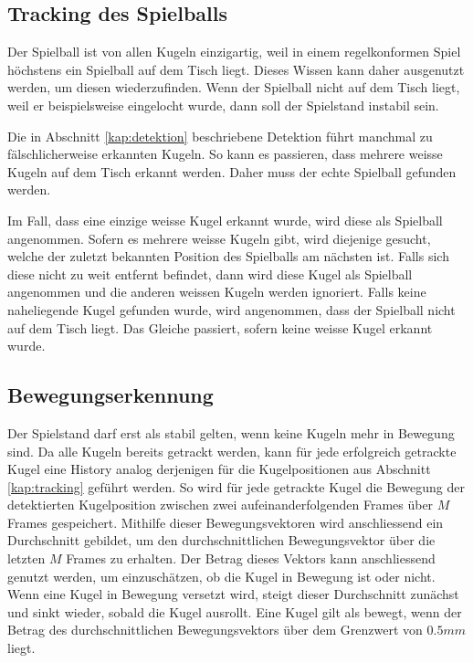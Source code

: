 \subsection{Tracking des Spielballs}
Der Spielball ist von allen Kugeln einzigartig, weil in einem regelkonformen Spiel höchstens ein Spielball auf dem Tisch liegt.
Dieses Wissen kann daher ausgenutzt werden, um diesen wiederzufinden.
Wenn der Spielball nicht auf dem Tisch liegt, weil er beispielsweise eingelocht wurde, dann soll der Spielstand instabil sein.

Die in Abschnitt \ref{kap:detektion} beschriebene Detektion führt manchmal zu fälschlicherweise erkannten Kugeln.
So kann es passieren, dass mehrere weisse Kugeln auf dem Tisch erkannt werden.
Daher muss der echte Spielball gefunden werden.

Im Fall, dass eine einzige weisse Kugel erkannt wurde, wird diese als Spielball angenommen.
Sofern es mehrere weisse Kugeln gibt, wird diejenige gesucht, welche der zuletzt bekannten Position des Spielballs am nächsten ist.
Falls sich diese nicht zu weit entfernt befindet, dann wird diese Kugel als Spielball angenommen und die
anderen weissen Kugeln werden ignoriert.
Falls keine naheliegende Kugel gefunden wurde, wird angenommen, dass der Spielball nicht auf dem Tisch liegt.
Das Gleiche passiert, sofern keine weisse Kugel erkannt wurde.

\subsection{Bewegungserkennung}
Der Spielstand darf erst als stabil gelten, wenn keine Kugeln mehr in Bewegung sind.
Da alle Kugeln bereits getrackt werden, kann für jede erfolgreich getrackte Kugel eine History analog derjenigen für die
Kugelpositionen aus Abschnitt \ref{kap:tracking} geführt werden.
So wird für jede getrackte Kugel die Bewegung der detektierten Kugelposition zwischen zwei aufeinanderfolgenden Frames
über $M$ Frames gespeichert.
Mithilfe dieser Bewegungsvektoren wird anschliessend ein Durchschnitt gebildet, um den durchschnittlichen Bewegungsvektor über
die letzten $M$ Frames zu erhalten.
Der Betrag dieses Vektors kann anschliessend genutzt werden, um einzuschätzen, ob die Kugel in Bewegung ist oder nicht.
Wenn eine Kugel in Bewegung versetzt wird, steigt dieser Durchschnitt zunächst und sinkt wieder, sobald die Kugel ausrollt.
Eine Kugel gilt als bewegt, wenn der Betrag des durchschnittlichen Bewegungsvektors über dem Grenzwert von $0.5mm$ liegt.

